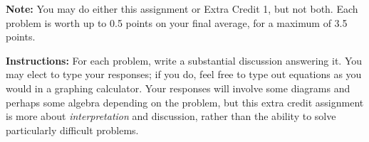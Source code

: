 \documentclass[12pt]{article}
\begin{document}
\newpage
\Large
\centerline{}
\normalsize
\centerline{}

\normalsize

{\bf Note:} You may do either this assignment or Extra Credit 1, but not both. Each problem is worth up to 0.5 points on your final average, for a maximum of 3.5 points.

{\bf Instructions:} For each problem, write a substantial discussion answering it. You may elect to type your responses; if you do, feel free to type out equations as you
would in a graphing calculator. Your responses will involve some diagrams and perhaps some algebra depending on the problem, but this extra credit assignment is more about
{\it interpretation} and discussion, rather than the ability to solve particularly difficult problems. 
\end{document}
